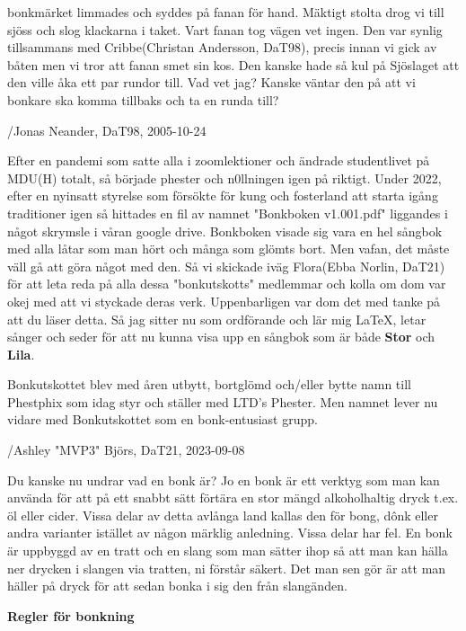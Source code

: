 bonkmärket limmades och syddes på fanan för hand. Mäktigt stolta drog vi till sjöss och slog klackarna i taket. Vart fanan tog vägen vet ingen. Den var synlig tillsammans med Cribbe(Christan Andersson, DaT98), precis innan vi gick av båten men vi tror att fanan smet sin kos. Den kanske hade så kul på Sjöslaget att den ville åka ett par rundor till. Vad vet jag? Kanske väntar den på att vi bonkare ska komma tillbaks och ta en runda till?

/Jonas Neander, DaT98, 2005-10-24

Efter en pandemi som satte alla i zoomlektioner och ändrade studentlivet på MDU(H) totalt, så började phester och n0llningen igen på riktigt. Under 2022, efter en nyinsatt styrelse som försökte för kung och fosterland att starta igång traditioner igen så hittades en fil av namnet "Bonkboken v1.001.pdf" liggandes i något skrymsle i våran google drive. Bonkboken visade sig vara en hel sångbok med alla låtar som man hört och många som glömts bort. Men vafan, det måste väll gå att göra något med den. Så vi skickade iväg Flora(Ebba Norlin, DaT21) för att leta reda på alla dessa "bonkutskotts" medlemmar och kolla om dom var okej med att vi styckade deras verk. Uppenbarligen var dom det med tanke på att du läser detta. Så jag sitter nu som ordförande och lär mig LaTeX, letar sånger och seder för att nu kunna visa upp en sångbok som är både \textbf{Stor} och \textbf{Lila}.

Bonkutskottet blev med åren utbytt, bortglömd och/eller bytte namn till Phestphix som idag styr och ställer med LTD's Phester. Men namnet lever nu vidare med Bonkutskottet som en bonk-entusiast grupp.

/Ashley "MVP3" Björs, DaT21, 2023-09-08\newpage


Du kanske nu undrar vad en bonk är? Jo en bonk är ett verktyg som man kan använda för att på ett snabbt sätt förtära en stor mängd alkoholhaltig dryck t.ex. öl eller cider. Vissa delar av detta avlånga land kallas den för bong, dônk eller andra varianter istället av någon märklig anledning. Vissa delar har fel. En bonk är uppbyggd av en tratt och en slang som man sätter ihop så att man kan hälla ner drycken i slangen via tratten, ni förstår säkert. Det man sen gör är att man häller på dryck för att sedan bonka i sig den från slangänden.

\textbf{Regler för bonkning}

